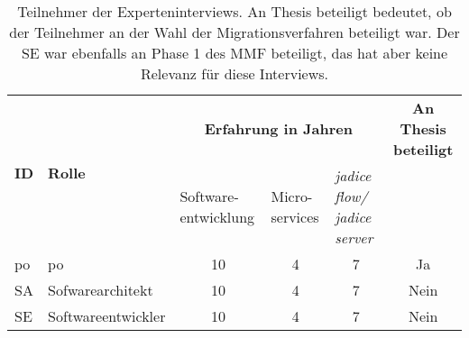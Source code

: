 \begin{table}[!ht]
  \centering
  \begin{tabular}{|l|l| p{1.8cm} p{1.5cm} p{2cm}|c|}
    \toprule
    \multirow{2}{*}[0cm]{\textbf{ID}} & \multirow{2}{*}[0cm]{\textbf{Rolle}} & \multicolumn{3}{c|}{\textbf{Erfahrung in Jahren}} & \textbf{An Thesis beteiligt} \\
     & & Software-entwicklung & Micro-services & \emph{jadice flow/ jadice server} & \\ \midrule
    \acrshort{po} & \acrlong{po} & \multicolumn{1}{c}{10} & \multicolumn{1}{c}{4} & \multicolumn{1}{c|}{7} & Ja \\
    SA & Sofwarearchitekt        & \multicolumn{1}{c}{10} & \multicolumn{1}{c}{4} & \multicolumn{1}{c|}{7} & Nein \\
    SE & Softwareentwickler      & \multicolumn{1}{c}{10} & \multicolumn{1}{c}{4} & \multicolumn{1}{c|}{7} & Nein \\
    \bottomrule
  \end{tabular}
  \caption[Teilnehmer der Experteninterviews]{
    Teilnehmer der Experteninterviews.
    An Thesis beteiligt bedeutet, ob der Teilnehmer an der Wahl der Migrationsverfahren beteiligt war.
    Der SE war ebenfalls an Phase 1 des MMF beteiligt, das hat aber keine Relevanz für diese Interviews.
  }
  \label{tab:expert-interviewees}
\end{table}
